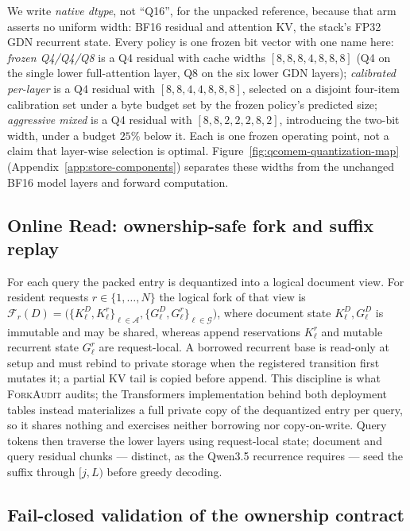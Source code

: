 \documentclass{article}
\newcommand{\method}{\textsc{ForkAudit}}
\begin{document}
We write \emph{native dtype}, not ``Q16'', for the unpacked reference, because
that arm asserts no uniform width: BF16 residual and attention KV, the stack's
FP32 GDN recurrent state.  Every policy is one frozen bit vector with one name
here: \emph{frozen Q4/Q4/Q8} is a Q4 residual with cache widths
$[8,8,8,4,8,8,8]$ (Q4 on the single lower full-attention layer, Q8 on the six
lower GDN layers); \emph{calibrated per-layer} is a Q4 residual with
$[8,8,4,4,8,8,8]$, selected on a disjoint four-item calibration set under a byte
budget set by the frozen policy's predicted size; \emph{aggressive mixed} is a
Q4 residual with $[8,8,2,2,2,8,2]$, introducing the two-bit width, under a
budget $25\%$ below it.  Each is one frozen operating point, not a claim that
layer-wise selection is optimal.  Figure~\ref{fig:qcomem-quantization-map}
(Appendix~\ref{app:store-components}) separates these widths from the unchanged
BF16 model layers and forward computation.

\subsection{Online Read: ownership-safe fork and suffix replay}
\label{sec:read}

For each query the packed entry is dequantized into a logical document view.  For
resident requests \(r\in\{1,\ldots,N\}\) the logical fork of that view is
\(\mathcal{F}_r(D)=\bigl(\{K^D_\ell,K^r_\ell\}_{\ell\in\mathcal A},
\{G^D_\ell,G^r_\ell\}_{\ell\in\mathcal G}\bigr)\),
where document state \(K^D_\ell,G^D_\ell\) is immutable and may be shared,
whereas append reservations \(K^r_\ell\) and mutable recurrent state
\(G^r_\ell\) are request-local.  A borrowed recurrent base is read-only at setup
and must rebind to private storage when the registered transition first mutates
it; a partial KV tail is copied before append.  This discipline is what
\method{} audits; the Transformers implementation behind both deployment tables
instead materializes a full private copy of the dequantized entry per query, so
it shares nothing and exercises neither borrowing nor copy-on-write.  Query
tokens then traverse the lower layers using request-local state; document and
query residual chunks --- distinct, as the Qwen3.5 recurrence requires --- seed
the suffix through $[j,L)$ before greedy decoding.

\subsection{Fail-closed validation of the ownership contract}
\label{sec:contract}
\end{document}
